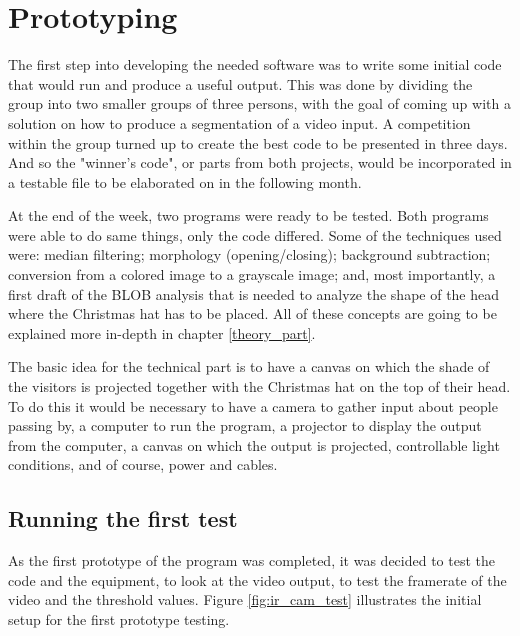 \section{Prototyping}
The first step into developing the needed software was to write some initial code that would run and produce a useful output. This was done by dividing the group into two smaller groups of three persons, with the goal of coming up with a solution on how to produce a segmentation of a video input. A competition within the group turned up to create the best code to be presented in three days. And so the "winner's code", or parts from both projects, would be incorporated in a testable file to be elaborated on in the following month.

At the end of the week, two programs were ready to be tested. Both programs were able to do same things, only the code differed. Some of the techniques used were: median filtering; morphology (opening/closing); background subtraction; conversion from a colored image to a grayscale image; and, most importantly, a first draft of the BLOB analysis that is needed to analyze the shape of the head where the Christmas hat has to be placed. All of these concepts are going to be explained more in-depth in chapter \ref{theory_part}.

The basic idea for the technical part is to have a canvas on which the shade of the visitors is projected together with the Christmas hat on the top of their head. To do this it would be necessary to have a camera to gather input about people passing by, a computer to run the program, a projector to display the output from the computer, a canvas on which the output is projected, controllable light conditions, and of course, power and cables.


\subsection{Running the first test}
As the first prototype of the program was completed, it was decided to test the code and the  equipment, to look at the video output, to test the framerate of the video and the threshold values. Figure \ref{fig:ir_cam_test} illustrates the initial setup for the first prototype testing.

